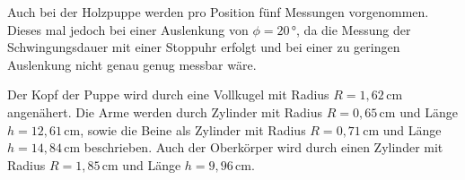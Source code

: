 Auch bei der Holzpuppe werden pro Position fünf
Messungen vorgenommen. Dieses mal jedoch bei einer
Auslenkung von $\phi=20\,\si{\degree}$, da die
Messung der Schwingungsdauer mit einer Stoppuhr
erfolgt und bei einer zu geringen Auslenkung nicht
genau genug messbar wäre.

Der Kopf der Puppe wird durch eine Vollkugel mit 
Radius $R=1,62\,\si{\centi\meter}$ angenähert.
Die Arme werden durch Zylinder mit Radius $R=0,65\,\si{\centi\meter}$
und Länge $h=12,61\,\si{\centi\meter}$, sowie die
Beine als Zylinder mit Radius $R=0,71\,\si{\centi\meter}$
und Länge $h=14,84\,\si{\centi\meter}$ beschrieben.
Auch der Oberkörper wird durch einen Zylinder mit 
Radius $R=1,85\,\si{\centi\meter}$
und Länge $h=9,96\,\si{\centi\meter}$.
